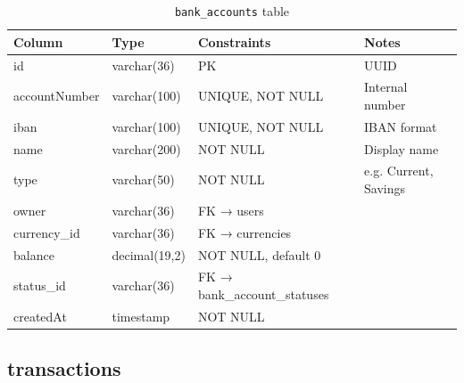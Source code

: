 \documentclass[12pt,a4paper]{report}
\begin{document}
\begin{table}[H]
  \centering
  \caption{\texttt{bank\_accounts} table}
  \begin{tabular}{llll}
    \toprule
    \textbf{Column} & \textbf{Type} & \textbf{Constraints} & \textbf{Notes} \\
    \midrule
    id             & varchar(36)   & PK              & UUID \\
    accountNumber  & varchar(100)  & UNIQUE, NOT NULL & Internal number \\
    iban           & varchar(100)  & UNIQUE, NOT NULL & IBAN format \\
    name           & varchar(200)  & NOT NULL         & Display name \\
    type           & varchar(50)   & NOT NULL         & e.g. Current, Savings \\
    owner          & varchar(36)   & FK → users       & \\
    currency\_id   & varchar(36)   & FK → currencies  & \\
    balance        & decimal(19,2) & NOT NULL, default 0 & \\
    status\_id     & varchar(36)   & FK → bank\_account\_statuses & \\
    createdAt      & timestamp     & NOT NULL         & \\
    \bottomrule
  \end{tabular}
\end{table}

\subsection{transactions}
\end{document}
